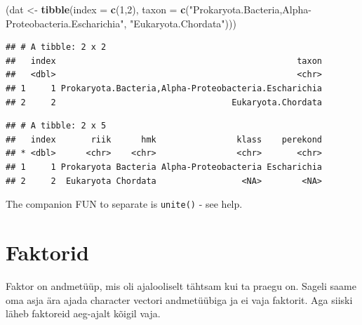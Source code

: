 \documentclass[]{book}
\newenvironment{Shaded}{\begin{snugshade}}{\end{snugshade}}
\newcommand{\KeywordTok}[1]{\textcolor[rgb]{0.13,0.29,0.53}{\textbf{#1}}}
\newcommand{\DataTypeTok}[1]{\textcolor[rgb]{0.13,0.29,0.53}{#1}}
\newcommand{\DecValTok}[1]{\textcolor[rgb]{0.00,0.00,0.81}{#1}}
\newcommand{\CharTok}[1]{\textcolor[rgb]{0.31,0.60,0.02}{#1}}
\newcommand{\StringTok}[1]{\textcolor[rgb]{0.31,0.60,0.02}{#1}}
\newcommand{\OperatorTok}[1]{\textcolor[rgb]{0.81,0.36,0.00}{\textbf{#1}}}
\newcommand{\NormalTok}[1]{#1}
\begin{document}
\begin{Shaded}
\begin{Highlighting}[]
\NormalTok{(dat <-}\StringTok{ }\KeywordTok{tibble}\NormalTok{(}\DataTypeTok{index =} \KeywordTok{c}\NormalTok{(}\DecValTok{1}\NormalTok{,}\DecValTok{2}\NormalTok{), }
               \DataTypeTok{taxon =} \KeywordTok{c}\NormalTok{(}\StringTok{"Prokaryota.Bacteria,Alpha-Proteobacteria.Escharichia"}\NormalTok{, }\StringTok{"Eukaryota.Chordata"}\NormalTok{)))}
\end{Highlighting}
\end{Shaded}

\begin{verbatim}
## # A tibble: 2 x 2
##   index                                                taxon
##   <dbl>                                                <chr>
## 1     1 Prokaryota.Bacteria,Alpha-Proteobacteria.Escharichia
## 2     2                                   Eukaryota.Chordata
\end{verbatim}

\begin{Shaded}
\end{Shaded}

\begin{verbatim}
## # A tibble: 2 x 5
##   index       riik      hmk                klass    perekond
## * <dbl>      <chr>    <chr>                <chr>       <chr>
## 1     1 Prokaryota Bacteria Alpha-Proteobacteria Escharichia
## 2     2  Eukaryota Chordata                 <NA>        <NA>
\end{verbatim}

The companion FUN to separate is \texttt{unite()} - see help.

\section{Faktorid}\label{faktorid}

Faktor on andmetüüp, mis oli ajalooliselt tähtsam kui ta praegu on.
Sageli saame oma asja ära ajada character vectori andmetüübiga ja ei
vaja faktorit. Aga siiski läheb faktoreid aeg-ajalt kõigil vaja.
\end{document}
